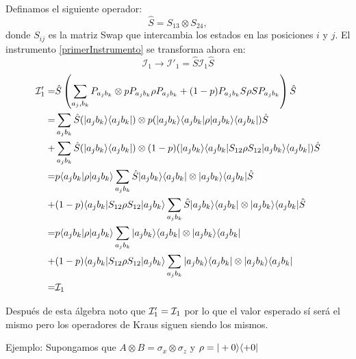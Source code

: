 \documentclass[12pt,oneside]{book}\raggedbottom{}
\begin{document}
Definamos el siguiente operador:\begin{equation}
	\hat{S}=S_{13}\otimes S_{24},
\end{equation} donde $S_{ij}$ es la matriz Swap que intercambia los estados en las posiciones $i$ y $j$. El instrumento {\ref{primerInstrumento}} se transforma ahora en:\[\mathcal{I}_1\to \mathcal{I}'_1= \hat{S}\mathcal{I}_1\hat{S}\]
\[\begin{split}
	\mathcal{I}'_1=&\hat{S}\left(\sum_{a_j,b_k} P_{a_j b_k}\otimes p P_{a_j b_k}\rho  P_{a_j b_k}+ (1-p) P_{a_j b_k}S\rho S  P_{a_j b_k}\right)\hat{S}\\
	=&\sum_{a_j b_k}\hat{S} (|a_j b_k\rangle \langle a_j b_k| )\otimes p (|a_j b_k\rangle \langle a_j b_k|\rho |a_j b_k \rangle \langle a_j b_k|)\hat{S}\\
	+&\sum_{a_j b_k}\hat{S} (|a_j b_k\rangle \langle a_j b_k| )\otimes (1-p) (|a_j b_k\rangle \langle a_j b_k| S_{12}\rho S_{12}  |a_j b_k\rangle \langle a_j b_k| )\hat{S}\\
	=&p\langle a_j b_k|\rho |a_j b_k\rangle \sum_{a_j b_k}\hat{S} |a_j b_k\rangle \langle a_j b_k| \otimes  |a_j b_k\rangle \langle a_j b_k|\hat{S}\\
	+&(1-p)\langle a_j b_k| S_{12}\rho S_{12}  |a_j b_k\rangle \sum_{a_j b_k}\hat{S} |a_j b_k\rangle \langle a_j b_k|\otimes |a_j b_k\rangle \langle a_j b_k|\hat{S}\\
	=&p\langle a_j b_k|\rho |a_j b_k\rangle \sum_{a_j b_k}|a_j b_k\rangle \langle a_j b_k| \otimes  |a_j b_k\rangle \langle a_j b_k|\\
	+&(1-p)\langle a_j b_k| S_{12}\rho S_{12}  |a_j b_k\rangle \sum_{a_j b_k} |a_j b_k\rangle \langle a_j b_k|\otimes |a_j b_k\rangle \langle a_j b_k|\\
	=&\mathcal{I}_1\\
\end{split}\]

Después de esta álgebra noto que $\mathcal{I}_1'=\mathcal{I}_1$ por lo que el valor esperado sí será el mismo pero los operadores de Kraus siguen siendo los mismos.

Ejemplo: Supongamos que $A\otimes B=\sigma_x\otimes \sigma_z$ y $\rho=|+0\rangle \langle +0|$
\end{document}
